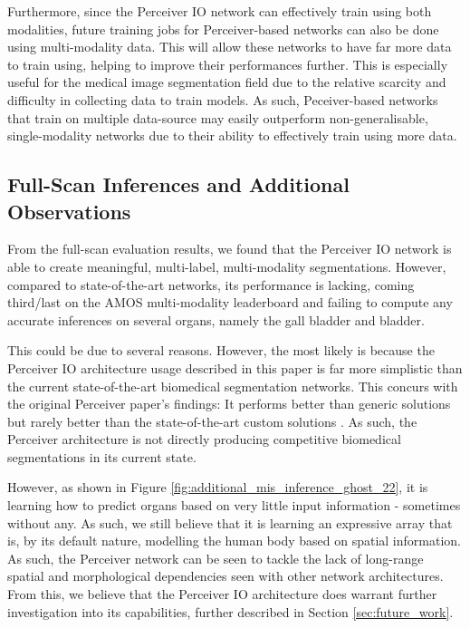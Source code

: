 \documentclass{l4proj}
\begin{document}
Furthermore, since the Perceiver IO network can effectively train using both modalities, future training jobs for Perceiver-based networks can also be done using multi-modality data. This will allow these networks to have far more data to train using, helping to improve their performances further. This is especially useful for the medical image segmentation field due to the relative scarcity and difficulty in collecting data to train models. As such, Peceiver-based networks that train on multiple data-source may easily outperform non-generalisable, single-modality networks  due to their ability to effectively train using more data.

\subsection{Full-Scan Inferences and Additional Observations}

From the full-scan evaluation results, we found that the Perceiver IO network is able to create meaningful, multi-label, multi-modality segmentations. However, compared to state-of-the-art networks, its performance is lacking, coming third/last on the AMOS multi-modality leaderboard and failing to compute any accurate inferences on several organs, namely the gall bladder and bladder.

This could be due to several reasons. However, the most likely is because the Perceiver IO architecture usage described in this paper is far more simplistic than the current state-of-the-art biomedical segmentation networks. This concurs with the original Perceiver paper's findings: It performs better than generic solutions but rarely better than the state-of-the-art custom solutions \citep{perceiver}. As such, the Perceiver architecture is not directly producing competitive biomedical segmentations in its current state.

However, as shown in Figure \ref{fig:additional_mis_inference_ghost_22}, it is learning how to predict organs based on very little input information - sometimes without any. As such, we still believe that it is learning an expressive array that is, by its default nature, modelling the human body based on spatial information. As such, the Perceiver network can be seen to tackle the lack of long-range spatial and morphological dependencies seen with other network architectures. From this, we believe that the Perceiver IO architecture does warrant further investigation into its capabilities, further described in Section \ref{sec:future_work}. 
\end{document}
